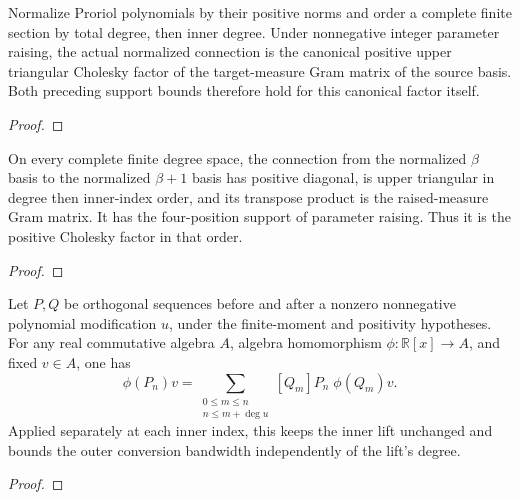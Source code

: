 \begin{theorem}
\label{thm:proriol-cholesky}
\leanok
Normalize Proriol polynomials by their positive norms and order a complete finite
section by total degree, then inner degree. Under nonnegative integer parameter
raising, the actual normalized connection is the canonical positive upper
triangular Cholesky factor of the target-measure Gram matrix of the source basis.
Both preceding support bounds therefore hold for this canonical factor itself.
\end{theorem}
\begin{proof}
\leanok
\end{proof}

\begin{theorem}
\label{thm:disk-gram-factor}
\leanok
On every complete finite degree space, the connection from the normalized
$\beta$ basis to the normalized $\beta+1$ basis has positive diagonal, is upper
triangular in degree then inner-index order, and its transpose product is the
raised-measure Gram matrix. It has the four-position support of parameter
raising. Thus it is the positive Cholesky factor in that order.
\end{theorem}
\begin{proof}
\leanok
\end{proof}

\begin{theorem}
\label{thm:separated-outer-expansion}
\leanok
Let $P,Q$ be orthogonal sequences before and after a nonzero nonnegative
polynomial modification $u$, under the finite-moment and positivity hypotheses.
For any real commutative algebra $A$, algebra homomorphism
$\phi:\mathbb R[x]\to A$, and fixed $v\in A$, one has
\[
 \phi(P_n)v=\sum_{\substack{0\le m\le n\\n\le m+\deg u}}
 [Q_m]P_n\;\phi(Q_m)v.
\]
Applied separately at each inner index, this keeps the inner lift unchanged
and bounds the outer conversion bandwidth independently of the lift's degree.

\end{theorem}
\begin{proof}
\leanok
\end{proof}

